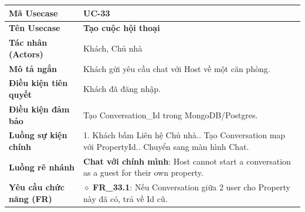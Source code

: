 \begin{table}[H]
\renewcommand{\arraystretch}{1.3}
\centering
\begin{tabularx}{\textwidth}{|p{4.5cm}|X|}
\hline
\cellcolor{gray!15}\bfseries Mã Usecase & \textbf{UC-33} \\ \hline
\cellcolor{gray!15}\bfseries Tên Usecase & \textbf{Tạo cuộc hội thoại} \\ \hline
\cellcolor{gray!15}\bfseries Tác nhân (Actors) & Khách, Chủ nhà \\ \hline
\cellcolor{gray!15}\bfseries Mô tả ngắn & Khách gửi yêu cầu chat với Host về một căn phòng. \\ \hline
\cellcolor{gray!15}\bfseries Điều kiện tiên quyết & Khách đã đăng nhập. \\ \hline
\cellcolor{gray!15}\bfseries Điều kiện đảm bảo & Tạo Conversation\_Id trong MongoDB/Postgres. \\ \hline
\cellcolor{gray!15}\bfseries Luồng sự kiện chính & 1. Khách bấm Liên hệ Chủ nhà.\newline 2. Tạo Conversation map với PropertyId.\newline 3. Chuyển sang màn hình Chat. \\ \hline
\cellcolor{gray!15}\bfseries Luồng rẽ nhánh & \textbf{Chat với chính mình}: Host cannot start a conversation as a guest for their own property. \\ \hline
\cellcolor{gray!15}\bfseries Yêu cầu chức năng (FR) & $\diamond$ \textbf{FR\_33.1}: Nếu Conversation giữa 2 user cho Property này đã có, trả về Id cũ. \\ \hline
\end{tabularx}
\end{table}

